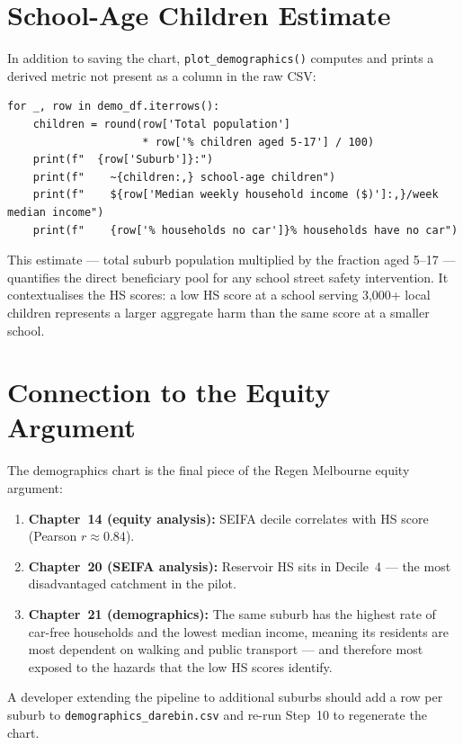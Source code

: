 \documentclass[11pt,a4paper,openany]{book}
\begin{document}
\section{School-Age Children Estimate}

In addition to saving the chart, \texttt{plot\_demographics()} computes and prints a
derived metric not present as a column in the raw CSV:

\begin{lstlisting}[style=python, caption={School-age children estimate printed to console.}]
for _, row in demo_df.iterrows():
    children = round(row['Total population']
                     * row['% children aged 5-17'] / 100)
    print(f"  {row['Suburb']}:")
    print(f"    ~{children:,} school-age children")
    print(f"    ${row['Median weekly household income ($)']:,}/week median income")
    print(f"    {row['% households no car']}% households have no car")
\end{lstlisting}

This estimate --- total suburb population multiplied by the fraction aged 5--17 ---
quantifies the direct beneficiary pool for any school street safety intervention.
It contextualises the HS scores: a low HS score at a school serving 3,000+ local
children represents a larger aggregate harm than the same score at a smaller school.

\section{Connection to the Equity Argument}

The demographics chart is the final piece of the Regen Melbourne equity argument:

\begin{enumerate}
  \item \textbf{Chapter~14 (equity analysis):} SEIFA decile correlates with HS score
    (Pearson $r \approx 0.84$).
  \item \textbf{Chapter~20 (SEIFA analysis):} Reservoir HS sits in Decile~4 --- the
    most disadvantaged catchment in the pilot.
  \item \textbf{Chapter~21 (demographics):} The same suburb has the highest rate of
    car-free households and the lowest median income, meaning its residents are most
    dependent on walking and public transport --- and therefore most exposed to the
    hazards that the low HS scores identify.
\end{enumerate}

A developer extending the pipeline to additional suburbs should add a row per suburb to
\texttt{demographics\_darebin.csv} and re-run Step~10 to regenerate the chart.
\end{document}
